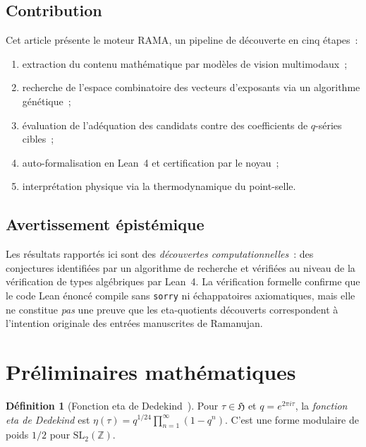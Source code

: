 \documentclass[11pt,a4paper]{article}
\theoremstyle{plain}
\theoremstyle{definition}
\newtheorem{definition}[theorem]{Définition}
\newcommand{\RAMA}{\textsc{RAMA}}
\newcommand{\ZZ}{\mathbb{Z}}
\begin{document}
\subsection{Contribution}

Cet article présente le moteur \RAMA{}, un pipeline de
découverte en cinq étapes~:
\begin{enumerate}[label=(\roman*)]
  \item extraction du contenu mathématique par modèles
        de vision multimodaux~;
  \item recherche de l'espace combinatoire des vecteurs
        d'exposants via un algorithme génétique~;
  \item évaluation de l'adéquation des candidats contre
        des coefficients de $q$-séries cibles~;
  \item auto-formalisation en Lean~4 et certification
        par le noyau~;
  \item interprétation physique via la thermodynamique
        du point-selle.
\end{enumerate}

\subsection{Avertissement épistémique}

Les résultats rapportés ici sont des \emph{découvertes
computationnelles}~: des conjectures identifiées par un
algorithme de recherche et vérifiées au niveau de la
vérification de types algébriques par Lean~4.  La
vérification formelle confirme que le code Lean énoncé
compile sans \texttt{sorry} ni échappatoires axiomatiques,
mais elle ne constitue \emph{pas} une preuve que les
eta-quotients découverts correspondent à l'intention
originale des entrées manuscrites de Ramanujan.

\section{Préliminaires mathématiques}
\label{sec:math_prelim}

\begin{definition}[Fonction eta de Dedekind~\cite{dedekind_1877}]
Pour $\tau \in \mathfrak{H}$ et $q = e^{2\pi i \tau}$,
la \emph{fonction eta de Dedekind} est
$\eta(\tau) = q^{1/24} \prod_{n=1}^{\infty} (1 - q^n)$.
C'est une forme modulaire de poids $1/2$ pour
$\mathrm{SL}_2(\ZZ)$.
\end{definition}
\end{document}
